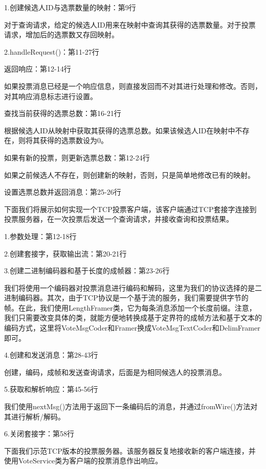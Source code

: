 		

		1.创建候选人ID与选票数量的映射：第9行 

		对于查询请求，给定的候选人ID用来在映射中查询其获得的选票数量。对于投票请求，增加后的选票数又存回映射。 

		2.handleRequest()：第11-27行 

		返回响应：第12-14行 

		如果投票消息已经是一个响应信息，则直接发回而不对其进行处理和修改。否则，对其响应消息标志进行设置。 

		查找当前获得的选票总数：第16-21行 

		根据候选人ID从映射中获取其获得的选票总数。如果该候选人ID在映射中不存在，则将其获得的选票数设为0。 

		如果有新的投票，则更新选票总数：第12-24行 

		如果之前候选人不存在，则创建新的映射，否则，只是简单地修改已有的映射。 

		设置选票总数并返回消息：第25-26行 

		下面我们将展示如何实现一个TCP投票客户端，该客户端通过TCP套接字连接到投票服务器，在一次投票后发送一个查询请求，并接收查询和投票结果。 

		

		1.参数处理：第12-18行 

		2.创建套接字，获取输出流：第20-21行 

		3.创建二进制编码器和基于长度的成帧器：第23-26行 

		我们将使用一个编码器对投票消息进行编码和解码，这里为我们的协议选择的是二进制编码器。其次，由于TCP协议是一个基于流的服务，我们需要提供字节的帧。在此，我们使用LengthFramer类，它为每条消息添加一个长度前缀。注意，我们只需要改变具体的类，就能方便地转换成基于定界符的成帧方法和基于文本的编码方式，这里将VoteMsgCoder和Framer换成VoteMsgTextCoder和DelimFramer即可。 

		4.创建和发送消息：第28-43行 

		创建，编码，成帧和发送查询请求，后面是为相同候选人的投票消息。 

		5.获取和解析响应：第45-56行 

		我们使用nextMsg()方法用于返回下一条编码后的消息，并通过fromWire()方法对其进行解析/解码。 

		6.关闭套接字：第58行 

		下面我们示范TCP版本的投票服务器。该服务器反复地接收新的客户端连接，并使用VoteService类为客户端的投票消息作出响应。 

